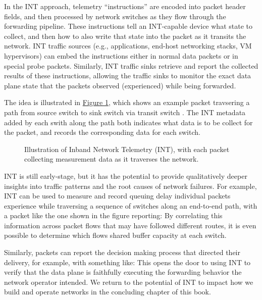 \documentclass[letterpaper,11pt,english]{sphinxmanual}
\let\sphinxpxdimen\pdfpxdimen\else\newdimen\sphinxpxdimen
\begin{document}
In the INT approach, telemetry “instructions” are encoded into packet
header fields, and then processed by network switches as they flow
through the forwarding pipeline. These instructions tell an
INT-capable device what state to collect, and then how to also write
that state into the packet as it transits the network. INT traffic
sources (e.g., applications, end-host networking stacks, VM
hypervisors) can embed the instructions either in normal data packets
or in special probe packets. Similarly, INT traffic sinks retrieve and
report the collected results of these instructions, allowing the
traffic sinks to monitor the exact data plane state that the packets
observed (experienced) while being forwarded.

The idea is illustrated in \hyperref[\detokenize{uses:fig-int}]{Figure \ref{\detokenize{uses:fig-int}}}, which shows
an example packet travsering a path from source switch  to sink
switch  via transit switch . The INT metadata added by each
swith along the path both indicates what data is to be collect for the
packet, and records the corresponding data for each switch.

\begin{figure}[htbp]
\centering
\capstart

\noindent\sphinxincludegraphics[width=700\sphinxpxdimen]{{Slide38}.png}
\caption{Illustration of Inband Network Telemetry (INT), with each packet
collecting measurement data as it traverses the network.}\label{\detokenize{uses:id5}}\label{\detokenize{uses:fig-int}}\end{figure}

INT is still early-stage, but it has the potential to provide
qualitatively deeper insights into traffic patterns and the root
causes of network failures. For example, INT can be used to measure
and record queuing delay individual packets experience while
traversing a sequence of switches along an end-to-end path, with a
packet like the one shown in the figure reporting:  By correlating this
information across packet flows that may have followed different
routes, it is even possible to determine which flows shared buffer
capacity at each switch.

Similarly, packets can report the decision making process that
directed their delivery, for example, with something like:  This opens the door to using INT to verify that the data plane
is faithfully executing the forwarding behavior the network operator
intended. We return to the potential of INT to impact how we build and
operate networks in the concluding chapter of this book.
\end{document}
